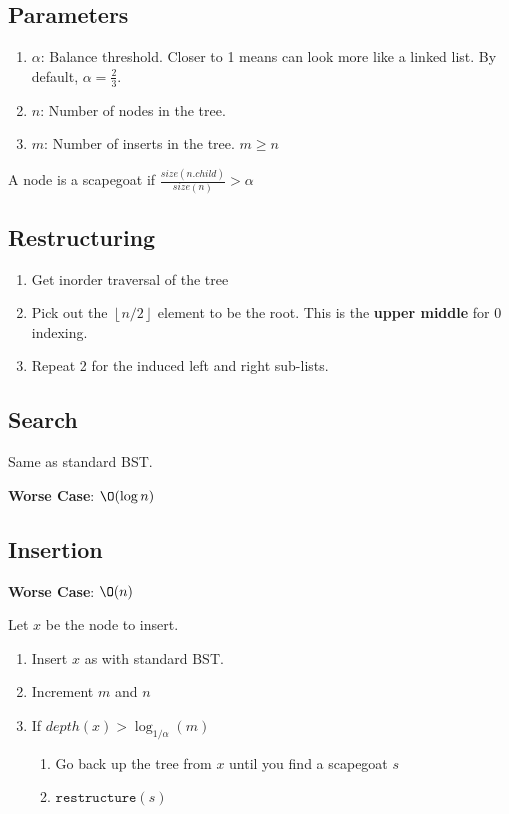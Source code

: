\documentclass[12pt, letterpaper]{article}
\newcommand{\fl}[1]{
    \left\lfloor #1 \right\rfloor
}
\begin{document}
\begin{multicols*}{3}
        \subsection{Parameters}
        \begin{enumerate}
            \item $\alpha$: Balance threshold. Closer to 1 means can look more like a linked list. By default, $\alpha = \frac{2}{3}$.
            \item $n$: Number of nodes in the tree.
            \item $m$: Number of inserts in the tree. $m \ge n$
        \end{enumerate}

        A node is a scapegoat if $\frac{size(n.child)}{size(n)} > \alpha$


        \subsection{Restructuring}

        \begin{enumerate}
            \item Get inorder traversal of the tree
            \item Pick out the $\fl{n / 2}$ element to be the root. This is the {\bf upper middle} for 0 indexing.
            \item Repeat 2 for the induced left and right sub-lists.
        \end{enumerate}


        
        \subsection{Search}

        Same as standard BST.

        {\bf Worse Case}: $\O(\log n)$
        
        
        \subsection{Insertion}

        {\bf Worse Case}: $\O(n)$
        
        Let $x$ be the node to insert.

        \begin{enumerate}
            \item Insert $x$ as with standard BST.
            \item Increment $m$ and $n$
            \item If $depth(x) > \log_{1 / \alpha}(m)$
            \begin{enumerate}[label=\roman*.]
                \item Go back up the tree from $x$ until you find a scapegoat $s$
                \item $\texttt{restructure}(s)$
            \end{enumerate}
        \end{enumerate}


\end{multicols*}
\end{document}
